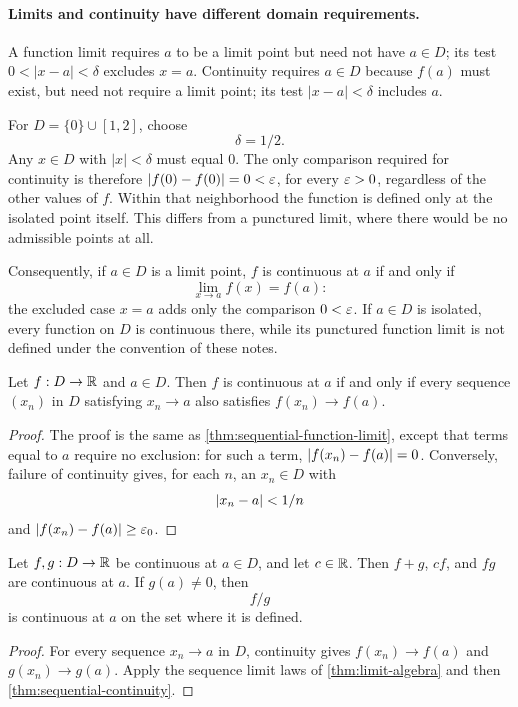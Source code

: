 \paragraph{Limits and continuity have different domain requirements.}
A function limit requires $a$ to be a limit point but need not have
$a\in D$; its test $0<|x-a|<\delta$ excludes $x=a$. Continuity
requires $a\in D$ because $f(a)$ must exist, but need not require a
limit point; its test $|x-a|<\delta$ includes $a$.

For $D=\{0\}\cup[1,2]$, choose
\[
\delta=1/2.
\]
 Any $x\in D$ with
$|x|<\delta$ must equal $0$. The only comparison required for continuity
is therefore $|f(0)-f(0)|=0<\varepsilon$, for every $\varepsilon>0$, regardless
of the other values of $f$. Within that neighborhood the function is
defined only at the isolated point itself. This differs from a punctured
limit, where there would be no admissible points at all.

Consequently, if $a\in D$ is a limit point, $f$ is continuous at $a$
if and only if
\[
\lim_{x\to a}f(x)=f(a):
\]
 the excluded case $x=a$
adds only the comparison $0<\varepsilon$. If $a\in D$ is isolated, every
function on $D$ is continuous there, while its punctured function limit
is not defined under the convention of these notes.

\begin{theorem}
\label{thm:sequential-continuity}
Let $f:D\to\mathbb{R}$ and $a\in D$. Then $f$ is continuous at $a$ if and only if every sequence $(x_n)$ in $D$ satisfying $x_n\to a$ also satisfies $f(x_n)\to f(a)$.
\end{theorem}
\begin{proof}
The proof is the same as \cref{thm:sequential-function-limit}, except that terms equal to $a$ require no exclusion: for such a term, $\lvert f(x_n)-f(a)\rvert=0$. Conversely, failure of continuity gives, for each $n$, an $x_n\in D$ with
\[
\lvert x_n-a\rvert<1/n
\]
 and $\lvert f(x_n)-f(a)\rvert\geq\varepsilon_0$.
\end{proof}

\begin{theorem}
\label{thm:continuity-algebra}
Let $f,g:D\to\mathbb{R}$ be continuous at $a\in D$, and let $c\in\mathbb{R}$. Then $f+g$, $cf$, and $fg$ are continuous at $a$. If $g(a)\ne0$, then
\[
f/g
\]
 is continuous at $a$ on the set where it is defined.
\end{theorem}
\begin{proof}
For every sequence $x_n\to a$ in $D$, continuity gives $f(x_n)\to f(a)$ and $g(x_n)\to g(a)$. Apply the sequence limit laws of \cref{thm:limit-algebra} and then \cref{thm:sequential-continuity}.
\end{proof}

